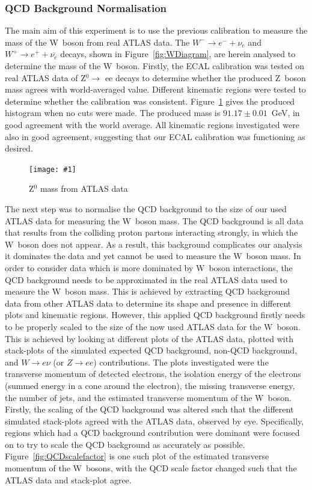 \documentclass[twocolumn]{article}
\newcommand{\insertFigure}[1]{%
   \texttt{[image: \#1]}%
}
\begin{document}
\subsubsection{QCD Background Normalisation} \label{sec:QCD}
The main aim of this experiment is to use the previous calibration to measure the mass of the W~boson from real ATLAS data. The $W^- \to e^- + \nu_e$ and $W^+ \to e^+ + \overline{\nu_e}$ decays, shown in Figure~\ref{fig:WDiagram}, are herein analysed to determine the mass of the W~boson. Firstly, the ECAL calibration was tested on real ATLAS data of Z$^0 \to$ ee decays to determine whether the produced Z~boson mass agrees with world-averaged value. Different kinematic regions were tested to determine whether the calibration was consistent. Figure~\ref{fig:Z0ATLAS} gives the produced histogram when no cuts were made. The produced mass is $91.17 \pm 0.01$~GeV, in good agreement with the world average. All kinematic regions investigated were also in good agreement, suggesting that our ECAL calibration was functioning as desired.
\begin{figure}[!h]
\centering
\insertFigure{Images/FirstWFitLabeled.png}
\caption{Z$^0$ mass from ATLAS data}
\label{fig:Z0ATLAS}
\end{figure}
\par The next step was to normalise the QCD background to the size of our used ATLAS data for measuring the W~boson mass. The QCD background is all data that results from the colliding proton partons interacting strongly, in which the W~boson does not appear. As a result, this background complicates our analysis it dominates the data and yet cannot be used to measure the W~boson mass. In order to consider data which is more dominated by W~boson interactions, the QCD background needs to be approximated in the real ATLAS data used to measure the W~boson mass. This is achieved by extracting QCD background data from other ATLAS data to determine its shape and presence in different plots and kinematic regions. However, this applied QCD background firstly needs to be properly scaled to the size of the now used ATLAS data for the W~boson. This is achieved by looking at different plots of the ATLAS data, plotted with stack-plots of the simulated expected QCD background, non-QCD background, and $W \to e\nu$ (or $Z \to ee$) contributions. The plots investigated were the transverse momentum of detected electrons, the isolation energy of the electrons (summed energy in a cone around the electron), the missing transverse energy, the number of jets, and the estimated transverse momentum of the W~boson. Firstly, the scaling of the QCD background was altered such that the different simulated stack-plots agreed with the ATLAS data, observed by eye. Specifically, regions which had a QCD background contribution were dominant were focused on to try to scale the QCD background as accurately as possible. Figure~\ref{fig:QCDscalefactor} is one such plot of the estimated transverse momentum of the W~bosons, with the QCD scale factor changed such that the ATLAS data and stack-plot agree.
\end{document}
